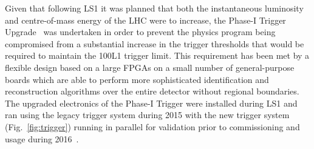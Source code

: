 Given that following LS1 it was planned that both the instantaneous luminosity and centre-of-mass energy of the LHC were to increase, the Phase-I Trigger Upgrade~\cite{Tapper:2013yva} was undertaken in order to prevent the physics program being compromised from a substantial increase in the trigger thresholds that would be required to maintain the 100\kHz L1 trigger limit.	
This requirement has been met by a flexible design based on a large FPGAs on a small number of general-purpose boards which are able to perform more sophisticated identification and reconstruction algorithms over the entire detector without regional boundaries.
The upgraded electronics of the Phase-I Trigger were installed during LS1 and ran using the legacy trigger system during 2015 with the new trigger system (Fig.~\ref{fig:trigger}) running in parallel for validation prior to commissioning and usage during 2016~\cite{Zabi:2017lya}.


